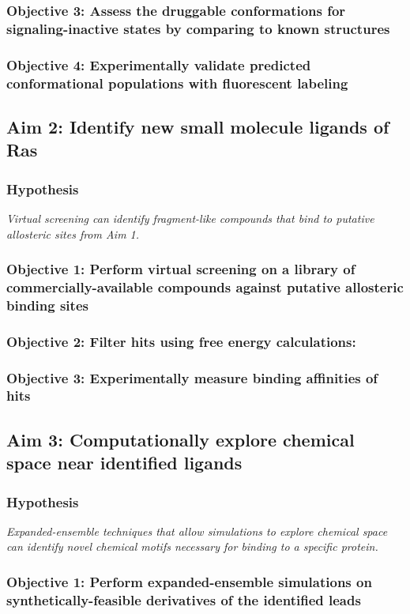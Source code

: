 \documentclass[12pt]{article}
\begin{document}
  \subsubsection*{Objective 3: Assess the druggable conformations for signaling-inactive states by comparing to known structures}
  \subsubsection*{Objective 4: Experimentally validate predicted conformational populations with fluorescent labeling}
 \subsection*{Aim 2: Identify new small molecule ligands of Ras}
 \subsubsection*{Hypothesis}
\textit{Virtual screening can identify fragment-like compounds that bind to putative allosteric sites from Aim 1.}
  \subsubsection*{Objective 1: Perform virtual screening on a library of commercially-available compounds against putative allosteric binding sites}
  \subsubsection*{Objective 2: Filter hits using free energy calculations:}
  \subsubsection*{Objective 3: Experimentally measure binding affinities of hits}
  \subsection*{Aim 3: Computationally explore chemical space near identified ligands}
  \subsubsection*{Hypothesis}
\textit{Expanded-ensemble techniques that allow simulations to explore chemical space can identify novel chemical motifs necessary for binding to a specific protein.}
  \subsubsection*{Objective 1: Perform expanded-ensemble simulations on synthetically-feasible derivatives of the identified leads}
\end{document}

